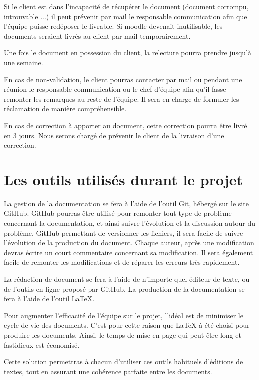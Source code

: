 Si le client est dans l’incapacité de récupérer le document (document corrompu, introuvable ...) il peut prévenir par mail le responsable communication afin que l’équipe puisse redéposer le livrable.
Si moodle devenait inutilisable, les documents seraient livrés au client par mail temporairement.

Une fois le document en possession du client, la relecture pourra prendre jusqu’à une semaine.

En cas de non-validation, le client pourras contacter par mail ou pendant une réunion le responsable communication ou le chef d’équipe afin qu’il fasse remonter les remarques au reste de l’équipe.
Il sera en charge de formuler les réclamation de manière compréhensible.

En cas de correction à apporter au document, cette correction pourra être livré en 3 jours.
Nous serons chargé de prévenir le client de la livraison d’une correction.

\section{Les outils utilisés durant le projet}

La gestion de la documentation se fera à l’aide de l’outil Git, hébergé sur le site GitHub.
GitHub pourras être utilisé pour remonter tout type de problème concernant la documentation, et ainsi suivre l'évolution et la discussion autour du problème.
GitHub permettant de versionner les fichiers, il sera facile de suivre l'évolution de la production du document.
Chaque auteur, après une modification devras écrire un court commentaire concernant sa modification.
Il sera également facile de remonter les modifications et de réparer les erreurs très rapidement.

La rédaction de document se fera à l’aide de n’importe quel éditeur de texte, ou de l'outils en ligne proposé par GitHub.
La production de la documentation se fera à l’aide de l'outil LaTeX.

Pour augmenter l'efficacité de l'équipe sur le projet, l’idéal est de minimiser le cycle de vie des documents.
C'est pour cette raison que LaTeX à été choisi pour produire les documents. Ainsi, le temps de mise en page qui peut être long et fastidieux est économisé.

Cette solution permettras à chacun  d’utiliser ces outils habituels d’éditions de textes, tout en assurant une cohérence parfaite entre les documents.

